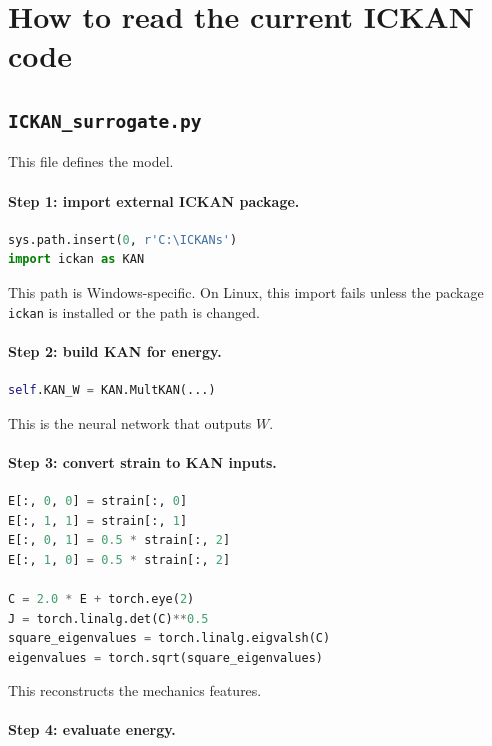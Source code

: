 \documentclass[11pt]{article}
\begin{document}
\section{How to read the current ICKAN code}

\subsection{\texttt{ICKAN\_surrogate.py}}

This file defines the model.

\paragraph{Step 1: import external ICKAN package.}

\begin{lstlisting}[language=Python]
sys.path.insert(0, r'C:\ICKANs')
import ickan as KAN
\end{lstlisting}

This path is Windows-specific. On Linux, this import fails unless the package
\texttt{ickan} is installed or the path is changed.

\paragraph{Step 2: build KAN for energy.}

\begin{lstlisting}[language=Python]
self.KAN_W = KAN.MultKAN(...)
\end{lstlisting}

This is the neural network that outputs $W$.

\paragraph{Step 3: convert strain to KAN inputs.}

\begin{lstlisting}[language=Python]
E[:, 0, 0] = strain[:, 0]
E[:, 1, 1] = strain[:, 1]
E[:, 0, 1] = 0.5 * strain[:, 2]
E[:, 1, 0] = 0.5 * strain[:, 2]

C = 2.0 * E + torch.eye(2)
J = torch.linalg.det(C)**0.5
square_eigenvalues = torch.linalg.eigvalsh(C)
eigenvalues = torch.sqrt(square_eigenvalues)
\end{lstlisting}

This reconstructs the mechanics features.

\paragraph{Step 4: evaluate energy.}
\end{document}
